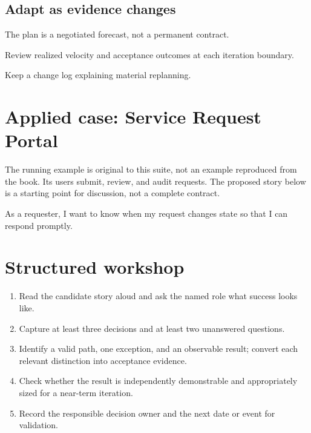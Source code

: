 \documentclass[11pt,letterpaper]{article}
\begin{document}
\subsection{Adapt as evidence changes}
The plan is a negotiated forecast, not a permanent contract.

\begin{tcolorbox}[colback=tealback,colframe=navy,title={Engineering translation},breakable]
Review realized velocity and acceptance outcomes at each iteration boundary.

\end{tcolorbox}
\begin{tcolorbox}[colback=amberback,colframe=navy,title={Failure mode to watch},breakable]
Keep a change log explaining material replanning.

\end{tcolorbox}
\section{Applied case: Service Request Portal}
The running example is original to this suite, not an example reproduced from the book. Its users submit, review, and audit requests. The proposed story below is a starting point for discussion, not a complete contract.

\begin{tcolorbox}[colback=blueback,colframe=navy,title={Candidate story},breakable]
As a requester, I want to know when my request changes state so that I can respond promptly.

\end{tcolorbox}
\section{Structured workshop}
\begin{enumerate}[leftmargin=*,itemsep=3pt]
\item Read the candidate story aloud and ask the named role what success looks like.
\item Capture at least three decisions and at least two unanswered questions.
\item Identify a valid path, one exception, and an observable result; convert each relevant distinction into acceptance evidence.
\item Check whether the result is independently demonstrable and appropriately sized for a near-term iteration.
\item Record the responsible decision owner and the next date or event for validation.
\end{enumerate}
\end{document}

